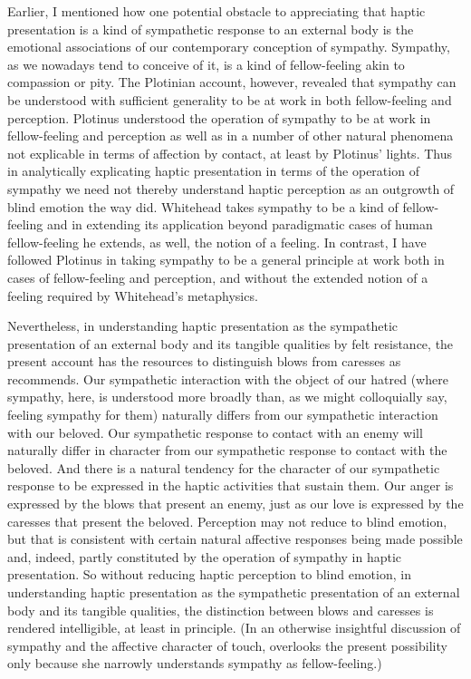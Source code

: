 Earlier, I mentioned how one potential obstacle to appreciating that haptic presentation is a kind of sympathetic response to an external body is the emotional associations of our contemporary conception of sympathy. Sympathy, as we nowadays tend to conceive of it, is a kind of fellow-feeling akin to compassion or pity. The Plotinian account, however, revealed that sympathy can be understood with sufficient generality to be at work in both fellow-feeling and perception. Plotinus understood the operation of sympathy to be at work in fellow-feeling and perception as well as in a number of other natural phenomena not explicable in terms of affection by contact, at least by Plotinus' lights. Thus in analytically explicating haptic presentation in terms of the operation of sympathy we need not thereby understand haptic perception as an outgrowth of blind emotion the way \citet[162--3]{Whitehead:1978zr} did. Whitehead takes sympathy to be a kind of fellow-feeling and in extending its application beyond paradigmatic cases of human fellow-feeling he extends, as well, the notion of a feeling. In contrast, I have followed Plotinus in taking sympathy to be a general principle at work both in cases of fellow-feeling and perception, and without the extended notion of a feeling required by Whitehead's metaphysics.


Nevertheless, in understanding haptic presentation as the sympathetic presentation of an external body and its tangible qualities by felt resistance, the present account has the resources to distinguish blows from caresses as \citet{Derrida:2005aa} recommends. Our sympathetic interaction with the object of our hatred (where sympathy, here, is understood more broadly than, as we might colloquially say, feeling sympathy for them) naturally differs from our sympathetic interaction with our beloved. Our sympathetic response to contact with an enemy will naturally differ in character from our sympathetic response to contact with the beloved. And there is a natural tendency for the character of our sympathetic response to be expressed in the haptic activities that sustain them. Our anger is expressed by the blows that present an enemy, just as our love is expressed by the caresses that present the beloved. Perception may not reduce to blind emotion, but that is consistent with certain natural affective responses being made possible and, indeed, partly constituted by the operation of sympathy in haptic presentation. So without reducing haptic perception to blind emotion, in understanding haptic presentation as the sympathetic presentation of an external body and its tangible qualities, the distinction between blows and caresses is rendered intelligible, at least in principle. (In an otherwise insightful discussion of sympathy and the affective character of touch, \citealt{Wyschogrod:1981qp} overlooks the present possibility only because she narrowly understands sympathy as fellow-feeling.)

